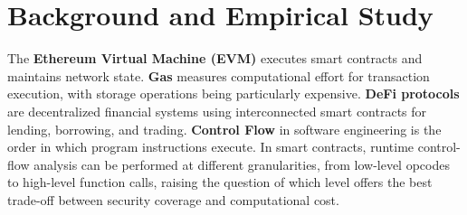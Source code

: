 \vspace{-2ex}
\section{Background and Empirical Study}
\label{sec:study}


The \textbf{Ethereum Virtual Machine (EVM)} 
executes smart contracts and maintains network state. 
\textbf{Gas} measures computational effort for transaction execution, 
with storage operations being particularly expensive. 
\textbf{DeFi protocols} are decentralized financial systems using 
interconnected smart contracts for lending, borrowing, and trading. 
\textbf{Control Flow} in software engineering is the order in 
which program instructions execute. In smart contracts, 
runtime control-flow analysis can be performed at different granularities, 
from low-level opcodes to high-level function calls, 
raising the question of which level offers the best 
trade-off between security coverage and computational cost. 



